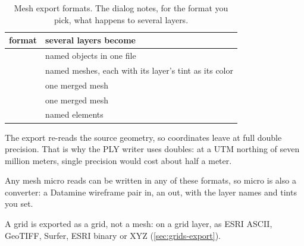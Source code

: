 \begin{table}[htbp]
\small
\begin{tabularx}{\linewidth}{@{}lL@{}}\toprule
format & several layers become \\ \midrule
{} & named objects in one file \\
 & named meshes, each with its layer's tint as its color \\
 & one merged mesh \\
 & one merged mesh \\
 & named elements \\
\bottomrule
\end{tabularx}
\caption{Mesh export formats. The dialog notes, for the format you pick, what happens to several layers.}\label{tab:meshes-export}
\end{table}


The export re-reads the source geometry, so coordinates leave at full double precision. That is why the PLY writer uses doubles: at a UTM northing of seven million meters, single precision would cost about half a meter.

Any mesh micro reads can be written in any of these formats, so micro is also a converter: a Datamine wireframe pair in, an  out, with the layer names and tints you set.

A grid is exported as a grid, not a mesh:  on a grid layer, as ESRI ASCII, GeoTIFF, Surfer, ESRI binary or XYZ (\cref{sec:grids-export}).
